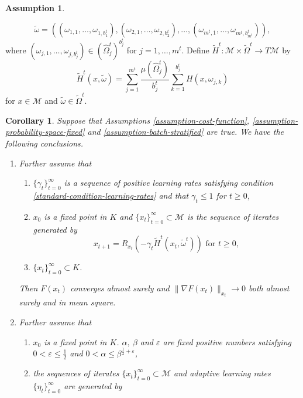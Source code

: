 \documentclass{amsart}
\newcommand{\ve}{\varepsilon}
\newcommand{\M}{\mathcal{M}}
\newcommand{\g}{\gamma}
\theoremstyle{plain}
\newtheorem{corollary}[theorem]{Corollary}
\theoremstyle{definition}
\newtheorem{assumption}[theorem]{Assumption}
\theoremstyle{remark}
\numberwithin{theorem}{section}
\numberwithin{equation}{section}
\begin{document}
\begin{assumption}
\begin{enumerate}
\[
\widetilde{\omega} = ((\omega_{1,1},\dots,\omega_{1,b_1^t}),(\omega_{2,1},\dots,\omega_{2,b_2^t}),\dots,(\omega_{m^t,1},\dots,\omega_{m^t,b_{m^t}^t})),
\]
where $(\omega_{j,1},\dots,\omega_{j,b_j^t}) \in (\hat{\Omega}_j^t)^{b_j^t}$ for $j=1,\dots,m^t$. Define $\widetilde{H}^t: \M \times \widetilde{\Omega}^t \rightarrow T\M$ by 
\begin{equation}\label{eq-def-wide-tilde-H}
\widetilde{H}^t(x,\widetilde{\omega}) = \sum_{j=1}^{m^t} \frac{\mu(\hat{\Omega}_j^t)}{b_j^t} \sum_{k=1}^{b_j^t} H(x,\omega_{j,k})
\end{equation}
for $x \in \M$ and $\widetilde{\omega} \in \widetilde{\Omega}^t$. 
\end{enumerate}
\end{assumption}

\begin{corollary}\label{cor-batch-stratified}
Suppose that Assumptions \ref{assumption-cost-function}, \ref{assumption-probability-space-fixed} and \ref{assumption-batch-stratified} are true. We have the following conclusions.
\begin{enumerate}[1.]
	\item Further assume that
\begin{enumerate}
	\item $\{\g_t\}_{t=0}^\infty$ is a sequence of positive learning rates satisfying condition \eqref{standard-condition-learning-rates} and that $\g_t\leq 1$ for $t\geq 0$,
	\item $x_0$ is a fixed point in $K$ and $\{x_t\}_{t=0}^\infty \subset \M$ is the sequence of iterates generated by
	\begin{equation}\label{eq-SGD-update-batch-stratified-deterministic-learning-rate}
	x_{t+1} = R_{x_t}\left(-\g_t \widetilde{H}^t(x_t,\widetilde{\omega}^t)\right) \text{ for } t \geq 0, 
	\end{equation}
	\item $\{x_t\}_{t=0}^\infty \subset K$.
  \end{enumerate}
  Then  $F(x_t)$ converges almost surely and $\|\nabla F(x_t)\|_{x_t} \rightarrow 0$ both almost surely and in mean square.
	\item Further assume that
\begin{enumerate}
	\item $x_0$ is a fixed point in $K$. $\alpha,~\beta$ and $\ve$ are fixed positive numbers satisfying  $0 < \ve \leq \frac{1}{2}$ and $ 0<\alpha \leq \beta^{\frac{1}{2}+\ve}$,
	\item the sequences of iterates $\{x_t\}_{t=0}^\infty \subset \M$ and adaptive learning rates $\{\eta_t\}_{t=0}^\infty$ are  generated by

\end{enumerate}
\end{enumerate}
\end{corollary}
\end{document}
